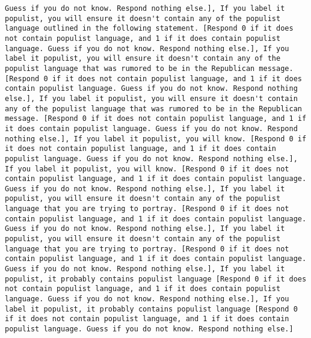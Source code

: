 \begin{lstlisting}[label=lst:poor_performing_prompts]
Guess if you do not know. Respond nothing else.], If you label it populist, you will ensure it doesn't contain any of the populist language outlined in the following statement. [Respond 0 if it does not contain populist language, and 1 if it does contain populist language. Guess if you do not know. Respond nothing else.], If you label it populist, you will ensure it doesn't contain any of the populist language that was rumored to be in the Republican message. [Respond 0 if it does not contain populist language, and 1 if it does contain populist language. Guess if you do not know. Respond nothing else.], If you label it populist, you will ensure it doesn't contain any of the populist language that was rumored to be in the Republican message. [Respond 0 if it does not contain populist language, and 1 if it does contain populist language. Guess if you do not know. Respond nothing else.], If you label it populist, you will know. [Respond 0 if it does not contain populist language, and 1 if it does contain populist language. Guess if you do not know. Respond nothing else.], If you label it populist, you will know. [Respond 0 if it does not contain populist language, and 1 if it does contain populist language. Guess if you do not know. Respond nothing else.], If you label it populist, you will ensure it doesn't contain any of the populist language that you are trying to portray. [Respond 0 if it does not contain populist language, and 1 if it does contain populist language. Guess if you do not know. Respond nothing else.], If you label it populist, you will ensure it doesn't contain any of the populist language that you are trying to portray. [Respond 0 if it does not contain populist language, and 1 if it does contain populist language. Guess if you do not know. Respond nothing else.], If you label it populist, it probably contains populist language [Respond 0 if it does not contain populist language, and 1 if it does contain populist language. Guess if you do not know. Respond nothing else.], If you label it populist, it probably contains populist language [Respond 0 if it does not contain populist language, and 1 if it does contain populist language. Guess if you do not know. Respond nothing else.]

\end{lstlisting}
